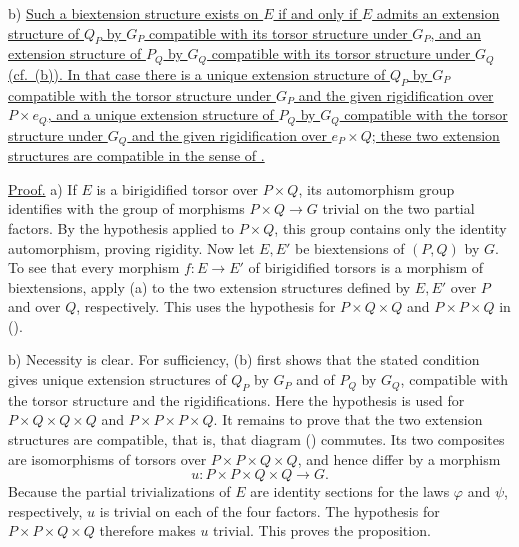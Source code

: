 \medskip
\noindent
b) \underline{Such a biextension structure exists on $E$ if and only
if $E$ admits an extension structure of $Q_P$ by $G_P$ compatible with
its torsor structure under $G_P$, and an extension structure of $P_Q$
by $G_Q$ compatible with its torsor structure under $G_Q$
(cf.\ (b)). In that case there is a unique extension structure of
$Q_P$ by $G_P$ compatible with the torsor structure under $G_P$ and
the given rigidification over $P\times e_Q$, and a unique extension
structure of $P_Q$ by $G_Q$ compatible with the torsor structure under
$G_Q$ and the given rigidification over $e_P\times Q$; these two
extension structures are compatible in the sense of .}

\underline{Proof.} a) If $E$ is a birigidified torsor over
$P\times Q$, its automorphism group identifies with the group of
morphisms $P\times Q\longrightarrow G$ trivial on the two partial
factors. By the hypothesis applied to $P\times Q$, this group contains
only the identity automorphism, proving rigidity. Now let $E,E'$ be
biextensions of $(P,Q)$ by $G$. To see that every morphism
$f:E\longrightarrow E'$ of birigidified torsors is a morphism of
biextensions, apply (a) to the two extension structures defined
by $E,E'$ over $P$ and over $Q$, respectively. This uses the
hypothesis for $P\times Q\times Q$ and $P\times P\times Q$ in
().

\noindent
b) Necessity is clear. For sufficiency, (b) first shows that the
stated condition gives unique extension structures of $Q_P$ by $G_P$
and of $P_Q$ by $G_Q$, compatible with the torsor structure and the
rigidifications. Here the hypothesis is used for
$P\times Q\times Q\times Q$ and $P\times P\times P\times Q$.
It remains to prove that the two extension structures are compatible,
that is, that diagram () commutes. Its two composites are
isomorphisms of torsors over $P\times P\times Q\times Q$, and hence
differ by a morphism
\[
 u:P\times P\times Q\times Q\longrightarrow G.
\]
Because the partial trivializations of $E$ are identity sections for
the laws $\varphi$ and $\psi$, respectively, $u$ is trivial on each of
the four factors. The hypothesis for
$P\times P\times Q\times Q$ therefore makes $u$ trivial. This proves
the proposition.

